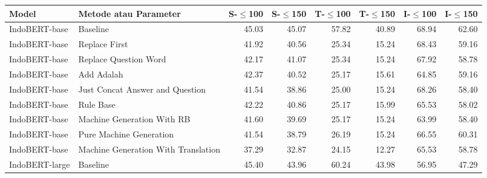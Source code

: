 \begin{table}[H]\centering
\scriptsize
\begin{tabular}{llrrrrrr}
\toprule
         Model &                              Metode atau Parameter &  S-$\leq$100 &  S-$\leq$150 &  T-$\leq$100 &  T-$\leq$150 &  I-$\leq$100 &  I-$\leq$150 \\
\midrule
 IndoBERT-base &                            Baseline &                  45.03 &                  45.07 &                  57.82 &                  40.89 &                  68.94 &                  62.60 \\
 IndoBERT-base &                       Replace First &                  41.92 &                  40.56 &                  25.34 &                  15.24 &                  68.43 &                  59.16 \\
 IndoBERT-base &               Replace Question Word &                  42.17 &                  41.07 &                  25.34 &                  15.24 &                  67.92 &                  58.78 \\
 IndoBERT-base &                          Add Adalah &                  42.37 &                  40.52 &                  25.17 &                  15.61 &                  64.85 &                  59.16 \\
 IndoBERT-base &     Just Concat Answer and Question &                  41.54 &                  38.86 &                  25.00 &                  15.24 &                  68.26 &                  58.40 \\
 IndoBERT-base &                           Rule Base &                  42.22 &                  40.86 &                  25.17 &                  15.99 &                  65.53 &                  58.02 \\
 IndoBERT-base &          Machine Generation With RB &                  41.60 &                  39.69 &                  25.17 &                  15.24 &                  63.99 &                  58.40 \\
 IndoBERT-base &             Pure Machine Generation &                  41.54 &                  38.79 &                  26.19 &                  15.24 &                  66.55 &                  60.31 \\
 IndoBERT-base & Machine Generation With Translation &                  37.29 &                  32.87 &                  24.15 &                  12.27 &                  65.53 &                  58.78 \\
\hline
IndoBERT-large &                            Baseline &                  45.40 &                  43.96 &                  60.24 &                  43.98 &                  56.95 &                  47.29 \\

\end{tabular}
\end{table}
